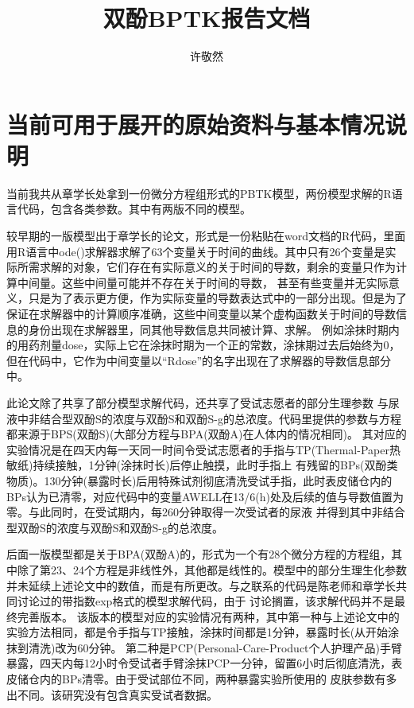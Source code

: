 \documentclass{article}
\date{}
\title{双酚BPTK报告文档}
\author{许敬然}
\begin{document}
\maketitle
\section*{当前可用于展开的原始资料与基本情况说明}

当前我共从章学长处拿到一份微分方程组形式的PBTK模型，两份模型求解的R语言代码，包含各类参数。其中有两版不同的模型。

较早期的一版模型出于章学长的论文，形式是一份粘贴在word文档的R代码，里面用R语言中ode()求解器求解了63个变量关于时间的曲线。其中只有26个变量是实际所需求解的对象，它们存在有实际意义的关于时间的导数，剩余的变量只作为计算中间量。这些中间量可能并不存在关于时间的导数，
甚至有些变量并无实际意义，只是为了表示更方便，作为实际变量的导数表达式中的一部分出现。但是为了保证在求解器中的计算顺序准确，这些中间变量以某个虚构函数关于时间的导数信息的身份出现在求解器里，同其他导数信息共同被计算、求解。
例如涂抹时期内的用药剂量dose，实际上它在涂抹时期为一个正的常数，涂抹期过去后始终为0，但在代码中，它作为中间变量以“Rdose”的名字出现在了求解器的导数信息部分中。

此论文除了共享了部分模型求解代码，还共享了受试志愿者的部分生理参数
与尿液中非结合型双酚S的浓度与双酚S和双酚S-g的总浓度。代码里提供的参数与方程都来源于BPS(双酚S)(大部分方程与BPA(双酚A)在人体内的情况相同)。
其对应的实验情况是在四天内每一天同一时间令受试志愿者的手指与TP(Thermal-Paper热敏纸)持续接触，1分钟(涂抹时长)后停止触摸，此时手指上
有残留的BPs(双酚类物质)。130分钟(暴露时长)后用特殊试剂彻底清洗受试手指，此时表皮储仓内的BPs认为已清零，对应代码中的变量AWELL在13/6(h)处及后续的值与导数值置为零。与此同时，在受试期内，每260分钟取得一次受试者的尿液
并得到其中非结合型双酚S的浓度与双酚S和双酚S-g的总浓度。

后面一版模型都是关于BPA(双酚A)的，形式为一个有28个微分方程的方程组，其中除了第23、24个方程是非线性外，其他都是线性的。模型中的部分生理生化参数并未延续上述论文中的数值，而是有所更改。与之联系的代码是陈老师和章学长共同讨论过的带指数exp格式的模型求解代码，由于
讨论搁置，该求解代码并不是最终完善版本。
该版本的模型对应的实验情况有两种，其中第一种与上述论文中的实验方法相同，都是令手指与TP接触，涂抹时间都是1分钟，暴露时长(从开始涂抹到清洗)改为60分钟。
第二种是PCP(Personal-Care-Product个人护理产品)手臂暴露，四天内每12小时令受试者手臂涂抹PCP一分钟，留置6小时后彻底清洗，表皮储仓内的BPs清零。由于受试部位不同，两种暴露实验所使用的
皮肤参数有多出不同。该研究没有包含真实受试者数据。
\end{document}
